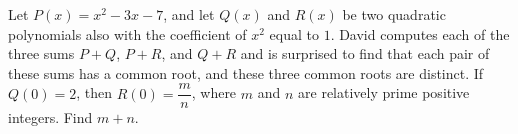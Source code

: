 Let $P(x) = x^2 - 3x - 7$, and let $Q(x)$ and $R(x)$ be two quadratic polynomials also with the coefficient of $x^2$ equal to $1$. David computes each of the three sums $P + Q$, $P + R$, and $Q + R$ and is surprised to find that each pair of these sums has a common root, and these three common roots are distinct. If $Q(0) = 2$, then $R(0) = \dfrac mn$, where $m$ and $n$ are relatively prime positive integers. Find $m+n$.